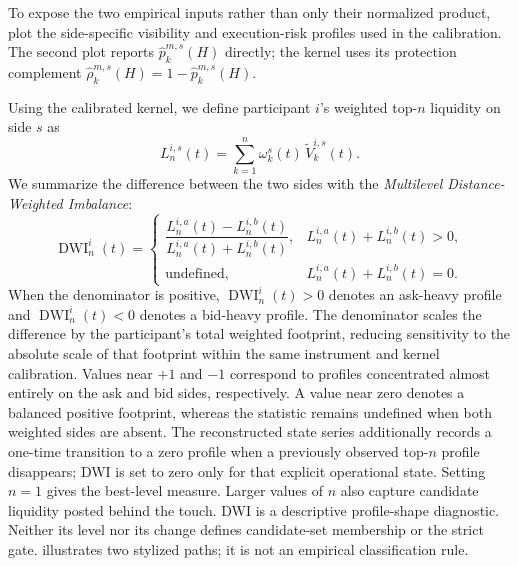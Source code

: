 \documentclass[11pt]{article}
\begin{document}
To expose the two empirical inputs rather than only their normalized product,
 plot the side-specific visibility
and execution-risk profiles used in the calibration. The second plot reports
$\widehat p^{m,s}_{k}(H)$ directly; the
kernel uses its protection complement $\widehat\rho^{m,s}_{k}(H)=1-\widehat p^{m,s}_{k}(H)$.


\FloatBarrier

Using the calibrated kernel, we define participant $i$'s weighted top-$n$ liquidity on side $s$ as
\begin{equation}
    L^{i,s}_{n}(t)
    =
    \sum_{k=1}^{n}
    \omega^{s}_{k}(t)\,\widetilde V^{i,s}_{k}(t).
    \label{eq:weighted_topn_liquidity}
\end{equation}
We summarize the difference between the two sides with the \textit{Multilevel Distance-Weighted Imbalance}:
\begin{equation}
    \operatorname{DWI}^{i}_{n}(t)
    =\begin{cases}
    \dfrac{
        L^{i,a}_{n}(t)-L^{i,b}_{n}(t)
    }{
        L^{i,a}_{n}(t)+L^{i,b}_{n}(t)
    },
    & L^{i,a}_{n}(t)+L^{i,b}_{n}(t)>0,\\
    \text{undefined},
    & L^{i,a}_{n}(t)+L^{i,b}_{n}(t)=0.
    \end{cases}
    \label{eq:multilevel_dwi}
\end{equation}
When the denominator is positive, $\operatorname{DWI}^{i}_{n}(t)>0$ denotes an ask-heavy profile and
$\operatorname{DWI}^{i}_{n}(t)<0$ denotes a bid-heavy profile. The denominator scales the difference by the participant's
total weighted footprint, reducing sensitivity to the absolute scale of that footprint within the same instrument and
kernel calibration. Values near $+1$ and $-1$ correspond to profiles concentrated almost entirely on the ask and bid sides,
respectively. A value near zero denotes a balanced positive footprint, whereas the statistic remains undefined when both
weighted sides are absent. The reconstructed state series additionally records a one-time transition to a zero profile when a
previously observed top-$n$ profile disappears; DWI is set to zero only for that explicit operational state. Setting $n=1$
gives the best-level measure. Larger values of $n$ also capture candidate liquidity posted behind the touch. DWI is a
descriptive profile-shape diagnostic. Neither its level nor its change defines candidate-set membership or the strict gate.
 illustrates two stylized paths; it is not an empirical classification rule.
\end{document}
